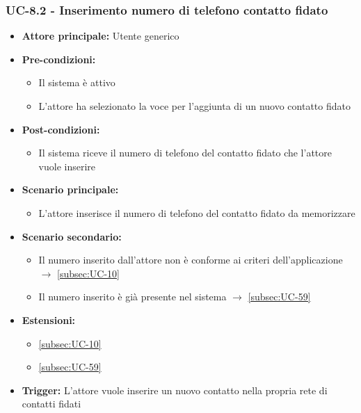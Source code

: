 \documentclass[a4paper,12pt]{article}
\begin{document}
\subsubsection{UC-8.2 - Inserimento numero di telefono contatto fidato} \label{subsec:UC-8.2}
\begin{itemize}
    \item \textbf{Attore principale:} Utente generico
    \item \textbf{Pre-condizioni:}
    \begin{itemize}
        \item Il sistema è attivo
        \item L'attore ha selezionato la voce per l'aggiunta di un nuovo contatto fidato
    \end{itemize}
    \item \textbf{Post-condizioni:} 
    \begin{itemize}
        \item Il sistema riceve il numero di telefono del contatto fidato che l'attore vuole inserire
    \end{itemize}
    \item \textbf{Scenario principale:} 
    \begin{itemize}
        \item L'attore inserisce il numero di telefono del contatto fidato da memorizzare
    \end{itemize}
    \item \textbf{Scenario secondario:}
    \begin{itemize}
        \item Il numero inserito dall'attore non è conforme ai criteri dell'applicazione $\rightarrow$ \ref{subsec:UC-10}
        \item Il numero inserito è già presente nel sistema $\rightarrow$ \ref{subsec:UC-59}
    \end{itemize}
    \item \textbf{Estensioni:} 
    \begin{itemize}
        \item \ref{subsec:UC-10}
        \item \ref{subsec:UC-59}
    \end{itemize}
    \item \textbf{Trigger:} L'attore vuole inserire un nuovo contatto nella propria rete di contatti fidati
\end{itemize}
\end{document}
